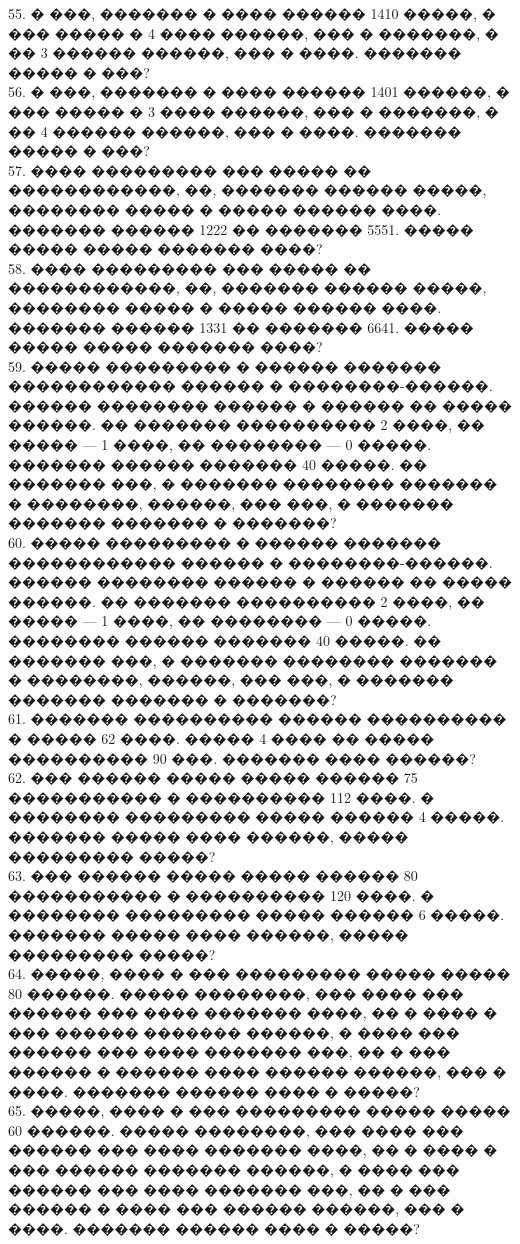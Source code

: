 \documentclass[12pt]{article}
\begin{document}
55. � ���, ������� � ���� ������ 1410 �����, � ��� ����� � 4 ���� ������, ��� � �������, � �� 3 ������ ������, ��� � ����. ������� ����� � ���?\\
56. � ���, ������� � ���� ������ 1401 ������, � ��� ����� � 3 ���� ������, ��� � �������, � �� 4 ������ ������, ��� � ����. ������� ����� � ���?\\
57. ���� ��������� ��� ����� �� ������������, ��, ������� ������ �����, �������� ����� � ����� ������ ����. ������� ������ 1222 �� ������� 5551. ����� ����� ����� ������� ����?\\
58. ���� ��������� ��� ����� �� ������������, ��, ������� ������ �����, �������� ����� � ����� ������ ����. ������� ������ 1331 �� ������� 6641. ����� ����� ����� ������� ����?\\
59. ����� ��������� � ������ ������� ������������ ������ � ��������-������. ������ �������� ������ � ������ �� ����� ������. �� ������� ���������� 2 ����, �� ����� --- 1 ����, �� �������� --- 0 �����. ������� ������ ������� 40 �����. �� ������� ���, � ������� �������� ������� � ��������, ������, ��� ���, � ������� ������� ������� � �������?\\
60. ����� ��������� � ������ ������� ������������ ������ � ��������-������. ������ �������� ������ � ������ �� ����� ������. �� ������� ���������� 2 ����, �� ����� --- 1 ����, �� �������� --- 0 �����. �������� ������ ������� 40 �����. �� ������� ���, � ������� �������� ������� � ��������, ������, ��� ���, � ������� ������� ������� � �������?\\
61. ������� ���������� ������ ���������� � ����� 62 ����. ����� 4 ���� �� ����� ���������� 90 ���. ������� ���� ������?\\
62. ��� ������ ����� ����� ������ 75 ����������� � ���������� 112 ����. � �������� ��������� ����� ������ 4 �����. ������� ����� ���� ������, ����� ��������� �����?\\
63. ��� ������ ����� ����� ������ 80 ����������� � ���������� 120 ����. � �������� ��������� ����� ������ 6 �����. ������� ����� ���� ������, ����� ��������� �����?\\
64. �����, ���� � ��� ��������� ����� ����� 80 ������. ����� ��������, ��� ���� ��� ������ ��� ���� ������� ����, �� � ���� � ��� ������ ������� ������, � ���� ��� ������ ��� ���� ������� ���, �� � ��� ������ � ������ ���� ������ ������, ��� � ����. ������� ������ ���� � �����?\\
65. �����, ���� � ��� ��������� ����� ����� 60 ������. ����� ��������, ��� ���� ��� ������ ��� ���� ������� ����, �� � ���� � ��� ������ ������� ������, � ���� ��� ������ ��� ���� ������� ���, �� � ��� ������ � ���� ��� ������ ������, ��� � ����. ������� ������ ���� � �����?\\
\end{document}
